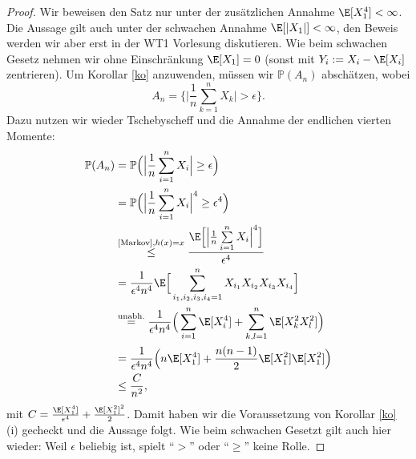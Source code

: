 \begin{proof}
	Wir beweisen den Satz nur unter der zus\"atzlichen Annahme $\E[X_1^4] < \infty$. Die Aussage gilt auch unter der schwachen Annahme $\E[|X_1|]<\infty$, den Beweis werden wir aber erst in der WT1 Vorlesung diskutieren. Wie beim schwachen Gesetz nehmen wir ohne Einschr\"ankung $\E[X_1] = 0$ (sonst mit $Y_i:=X_i-\E[X_i]$ zentrieren). Um Korollar \ref{ko} anzuwenden, m\"ussen wir $\mathbb P(A_n)$ absch\"atzen, wobei 
	\[ A_n = \Big\{ \Big| \frac{1}{n} \sum\limits_{k=1}^{n} X_k \Big| >\epsilon \Big\}. \] 
	Dazu nutzen wir wieder Tschebyscheff und die Annahme der endlichen vierten Momente:
	\begin{align*}
		\mathbb{P}(A_n) &= \mathbb{P}\Big(\Big| \frac{1}{n} \sum\limits_{i=1}^{n} X_i \Big| \geq \epsilon \Big)\\
		& = \mathbb{P}\Big(\Big| \frac{1}{n} \sum\limits_{i=1}^{n} X_i \Big|^4 \geq \epsilon^4 \Big)\\
		&\overset{\text{\ref{Markov}}, h(x)=x}{\leq} \frac{\E\Big[ \Big| \frac{1}{n} \sum\limits_{i=1}^{n} X_i \Big|^4\Big]}{\epsilon^4}\\
		& = \frac{1}{\epsilon^4 n^4}\E\Big[\sum\limits_{i_1,i_2,i_3,i_4=1}^{n} X_{i_1}  X_{i_2}  X_{i_3}  X_{i_4}  \Big] \\
		&\overset{\text{unabh.}}{=}  \frac{1}{\epsilon^4 n^4} \Big( \sum\limits_{i=1}^{n} \E[X_i^4]+ \sum\limits_{k,l=1}^{n} \E[X_k^2  X_l^2] \Big)\\
		&= \frac{1}{\epsilon^4n^4} \Big(n  \E[X_1^4] +\frac{n(n-1)}{2} \E[X_1^2]  \E[X_1^2] \Big)\\
		&\leq \frac{C}{n^2},
	\end{align*}
	mit $C=\frac{\E[X_1^4]}{\epsilon^4}+\frac{\E[X_1^2]^2}{2}$. Damit haben wir die Voraussetzung von Korollar \ref{ko} (i) gecheckt und die Aussage folgt. Wie beim schwachen Gesetzt gilt auch hier wieder: Weil $\epsilon$ beliebig ist, spielt \enquote{$>$} oder \enquote{$\geq$} keine Rolle.
	\end{proof}

